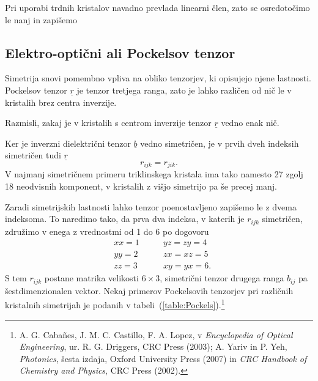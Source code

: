 Pri uporabi trdnih kristalov navadno prevlada linearni člen, zato se osredotočimo
le nanj in zapišemo

\subsection*{Elektro-optični ali Pockelsov tenzor}
Simetrija snovi pomembno vpliva na obliko tenzorjev, ki opisujejo njene lastnosti.
Pockelsov tenzor $\underline{r}$ je tenzor tretjega ranga, zato je lahko različen
od nič le v kristalih brez centra inverzije. 
\begin{naloga}
Razmisli, zakaj je v kristalih s centrom inverzije tenzor $\underline{r}$
vedno enak nič. 
\end{naloga}

Ker je inverzni dielektrični tenzor $\underline{b}$ vedno simetričen, je v 
prvih dveh indeksih simetričen tudi $\underline{r}$
\begin{equation}
r_{ijk} = r_{jik}.
\end{equation}
V najmanj simetričnem primeru triklinskega kristala ima tako namesto 27 zgolj 
18 neodvisnih komponent, v kristalih z višjo simetrijo pa še precej manj. 

Zaradi simetrijskih lastnosti lahko tenzor poenostavljeno zapišemo le z dvema
indeksoma. To naredimo tako, da prva dva indeksa, v katerih je $r_{ijk}$ simetričen, združimo
v enega z vrednostmi od 1 do 6 po dogovoru 
\begin{eqnarray}
 &xx=1 \qquad  &yz=zy = 4 \\
 &yy=2 \qquad  &zx=xz = 5 \\
 &zz=3 \qquad  &xy=yx = 6.
\end{eqnarray}
S tem $r_{ijk}$ postane matrika velikosti $6\times3$, simetrični tenzor drugega 
ranga $b_{ij}$ pa šestdimenzionalen vektor.
Nekaj primerov Pockelsovih tenzorjev pri različnih kristalnih simetrijah
je podanih v tabeli~(\ref{table:Pockels}).\footnote{A. G. Caba\~nes, J. M. C. Castillo, F. A. Lopez,
v {\it Encyclopedia of Optical Engineering}, ur. R. G. Driggers, CRC Press (2003); A. Yariv in 
P. Yeh, {\it Photonics}, šesta izdaja, Oxford University Press (2007) in
{\it CRC Handbook of Chemistry and Physics}, CRC Press (2002).}

